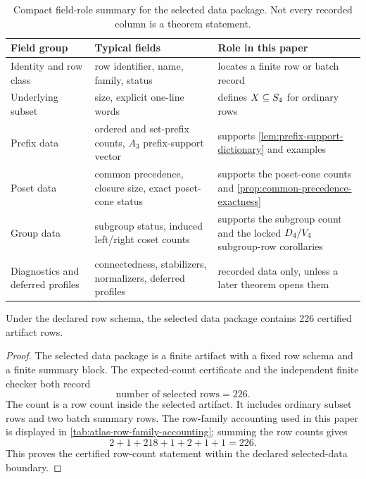 \begin{table}[htbp]
\centering
\small
\begin{tabular}{@{}p{}p{}p{}@{}}
\toprule
Field group & Typical fields & Role in this paper \\
\midrule
Identity and row class & row identifier, name, family, status & locates a finite row or batch record \\
Underlying subset & size, explicit one-line words & defines \(X\subseteq S_4\) for ordinary rows \\
Prefix data & ordered and set-prefix counts, \(A_3\) prefix-support vector & supports \cref{lem:prefix-support-dictionary} and examples \\
Poset data & common precedence, closure size, exact poset-cone status & supports the poset-cone counts and \cref{prop:common-precedence-exactness} \\
Group data & subgroup status, induced left/right coset counts & supports the subgroup count and the locked \(D_4/V_4\) subgroup-row corollaries \\
Diagnostics and deferred profiles & connectedness, stabilizers, normalizers, deferred profiles & recorded data only, unless a later theorem opens them \\
\bottomrule
\end{tabular}
\caption{Compact field-role summary for the selected data package. Not every recorded column is a theorem statement.}
\label{tab:atlas-field-roles}
\end{table}

\begin{certproposition}
\label{prop:selected-atlas-count}
Under the declared row schema, the selected data package contains 226 certified artifact rows.
\end{certproposition}

\begin{proof}
The selected data package is a finite artifact with a fixed row schema and a finite summary block. The expected-count certificate and the independent finite checker both record
\[
  \text{number of selected rows}=226.
\]
The count is a row count inside the selected artifact. It includes ordinary subset rows and two batch summary rows. The row-family accounting used in this paper is displayed in \cref{tab:atlas-row-family-accounting}; summing the row counts gives
\[
  2+1+218+1+2+1+1=226.
\]
This proves the certified row-count statement within the declared selected-data boundary.
\end{proof}

